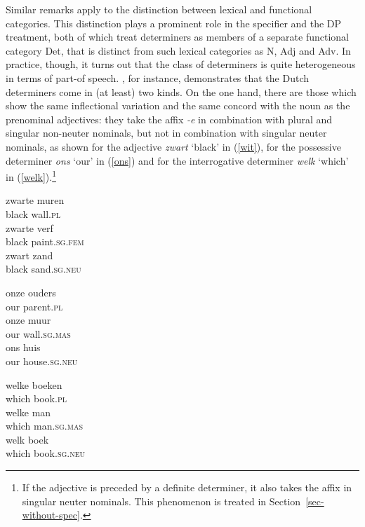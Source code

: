 \documentclass[output=paper
	        ,collection
	        ,collectionchapter
 	        ,biblatex
                ,babelshorthands
                ,newtxmath
                ,draftmode
                ,colorlinks, citecolor=brown
]{langscibook}
\begin{document}
Similar remarks apply to the distinction between lexical and functional categories. 
This distinction plays a prominent role in the specifier and the DP treatment, both of which treat 
determiners as members of a separate functional category Det, that is distinct from 
such lexical categories as N, Adj and Adv.
In practice, though, it turns out that the class of determiners is quite heterogeneous in 
terms of part-of speech. \citet{VanEynde06}, for instance, demonstrates that the 
Dutch determiners come in (at least) two kinds. On the one hand, there are those 
which show the same inflectional variation and the same concord with the noun as the 
prenominal adjectives: they take the affix \emph{-e} in combination with plural 
and singular non-neuter nominals, but not in combination with singular 
neuter nominals, as shown for the adjective \emph{zwart} `black' in (\ref{wit}), 
for the possessive determiner \emph{ons} `our' in (\ref{ons}) and for the 
interrogative determiner \emph{welk} `which' in (\ref{welk}).\footnote{If the adjective 
is preceded by a definite determiner, 
it also takes the affix in singular neuter nominals. This phenomenon is treated 
in Section~\ref{sec-without-spec}.} 

\begin{exe} 
\ex\label{wit} 
\begin{xlist}
\ex
\gll  zwarte muren      \\
      black wall.\textsc{pl} \\
\ex
\gll  zwarte verf \\
      black paint.\textsc{sg.fem} \\
\ex
\gll  zwart zand \\
      black sand.\textsc{sg.neu} \\
\end{xlist}
\ex\label{ons}
\begin{xlist}
\ex
\gll onze ouders     \\
     our parent.\textsc{pl}  \\
\ex
\gll onze muur     \\
     our wall.\textsc{sg.mas}  \\
\ex
\gll ons huis     \\
     our house.\textsc{sg.neu}  \\
\end{xlist}
\ex\label{welk}
\begin{xlist} 
\ex
\gll welke boeken  \\
     which book.\textsc{pl} \\
\ex
\gll welke man                 \\
     which man.\textsc{sg.mas}  \\
\ex
\gll welk boek   \\
     which book.\textsc{sg.neu} \\
\end{xlist}
\end{exe} 
\end{document}
